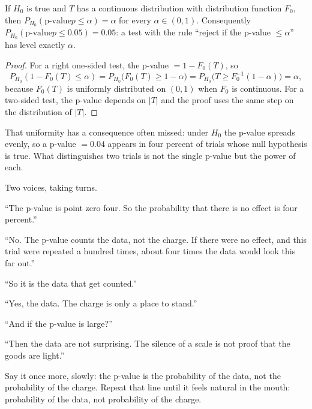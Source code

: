 \begin{teorema}
If $H_0$ is true and $T$ has a continuous distribution with distribution function $F_0$, then
$P_{H_0}(\text{p-value} p\le\alpha)=\alpha$ for every $\alpha\in(0,1)$. Consequently
$P_{H_0}(\text{p-value} p\le0.05)=0.05$: a test with the rule ``reject if the p-value
$\le\alpha$'' has level exactly $\alpha$.
\end{teorema}

\begin{proof}[Proof]
For a right one-sided test, the p-value $=1-F_0(T)$, so
\[
P_{H_0}(1-F_0(T)\le\alpha)
=P_{H_0}\bigl(F_0(T)\ge1-\alpha\bigr)
=P_{H_0}\bigl(T\ge F_0^{-1}(1-\alpha)\bigr)=\alpha,
\]
because $F_0(T)$ is uniformly distributed on $(0,1)$ when $F_0$ is continuous. For a two-sided
test, the p-value depends on $|T|$ and the proof uses the same step on the
distribution of $|T|$.
\end{proof}

That uniformity has a consequence often missed: under $H_0$ the p-value spreads evenly, so a
p-value $=0.04$ appears in four percent of trials whose null hypothesis is true. What
distinguishes two trials is not the single p-value but the power of each.

\begin{bacakeras}
Two voices, taking turns.

``The p-value is point zero four. So the probability that there is no effect is four
percent.''

``No. The p-value counts the data, not the charge. If there were no effect, and
this trial were repeated a hundred times, about four times the data would look this far out.''

``So it is the data that get counted.''

``Yes, the data. The charge is only a place to stand.''

``And if the p-value is large?''

``Then the data are not surprising. The silence of a scale is not proof that the goods are
light.''

Say it once more, slowly: the p-value is the probability of the data, not the probability of
the charge. Repeat that line until it feels natural in the mouth: probability of the data, not
probability of the charge.
\end{bacakeras}


